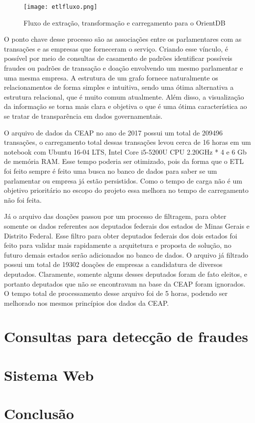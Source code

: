 \begin{figure}[H]
\centering
\texttt{[image: etlfluxo.png]}
\caption{Fluxo de extração, transformação e carregamento para o OrientDB}
\label{fig:etlfluxo}
\end{figure}

O ponto chave desse processo são as associações entre os parlamentares com as transações e as empresas que forneceram o serviço. Criando esse vínculo, é possível por meio de consultas de casamento de padrões identificar possíveis fraudes ou padrões de transação e doação envolvendo um mesmo parlamentar e uma mesma empresa. A estrutura de um grafo fornece naturalmente os relacionamentos de forma simples e intuitiva, sendo uma ótima alternativa a estrutura relacional, que é muito comum atualmente. Além disso, a visualização da informação se torna mais clara e objetiva o que é uma ótima característica ao se tratar de transparência em dados governamentais.

O arquivo de dados da CEAP no ano de 2017 possui um total de 209496 transações, o carregamento total dessas transações levou cerca de 16 horas em um notebook com Ubuntu 16-04 LTS, Intel Core i5-5200U CPU 2.20GHz * 4 e 6 Gb de memória RAM. Esse tempo poderia ser otimizado, pois da forma que o ETL foi feito sempre é feito uma busca no banco de dados para saber se um parlamentar ou empresa já estão persistidos. Como o tempo de carga não é um objetivo prioritário no escopo do projeto essa melhora no tempo de carregamento não foi feita.

Já o arquivo das doações passou por um processo de filtragem, para obter somente os dados referentes aos deputados federais dos estados de Minas Gerais e Distrito Federal. Esse filtro para obter deputados federais dos dois estados foi feito para validar mais rapidamente a arquitetura e proposta de solução, no futuro demais estados serão adicionados no banco de dados. O arquivo já filtrado possui um total de 19302 doações de empresas a candidatura de diversos deputados. Claramente, somente alguns desses deputados foram de fato eleitos, e portanto deputados que não se encontravam na base da CEAP foram ignorados. O tempo total de processamento desse arquivo foi de 5 horas, podendo ser melhorado nos mesmos princípios dos dados da CEAP.

\section{Consultas para detecção de fraudes}

\section{Sistema Web}

\section{Conclusão}